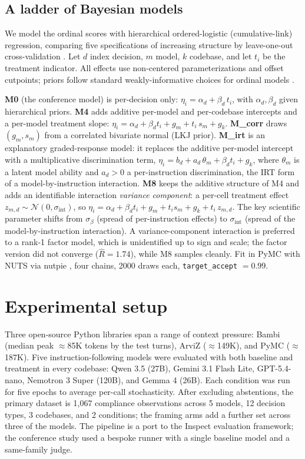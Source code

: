 \documentclass{llncs}
\begin{document}
\subsection{A ladder of Bayesian models}
\label{sec:models}
We model the ordinal scores with hierarchical ordered-logistic
(cumulative-link) regression, comparing five specifications of increasing
structure by leave-one-out cross-validation \parencite{vehtari2017loo}. Let
$d$ index decision, $m$ model, $k$ codebase, and let $t_i$ be the treatment
indicator. All effects use non-centered parameterizations and offset
cutpoints; priors follow standard weakly-informative choices for ordinal
models \parencite{mcelreath2020rethinking, burkner2021irt}.

\textbf{M0} (the conference model) is per-decision only:
$\eta_i = \alpha_{d} + \beta_{d}\, t_i$, with $\alpha_d, \beta_d$ given
hierarchical priors. \textbf{M4} adds additive per-model and per-codebase
intercepts and a per-model treatment slope:
$\eta_i = \alpha_d + \beta_d t_i + g_m + t_i\, s_m + g_k$. \textbf{M\_corr}
draws $(g_m, s_m)$ from a correlated bivariate normal (LKJ prior).
\textbf{M\_irt} is an explanatory graded-response model: it replaces the
additive per-model intercept with a multiplicative discrimination term,
$\eta_i = b_d + a_d\,\theta_m + \beta_d t_i + g_k$, where $\theta_m$ is a
latent model ability and $a_d>0$ a per-instruction discrimination, the IRT
form of a model-by-instruction interaction. \textbf{M8} keeps the additive
structure of M4 and adds an identifiable interaction \emph{variance
component}: a per-cell treatment effect
$z_{m,d}\sim\mathcal{N}(0, \sigma_{\text{int}})$, so
$\eta_i = \alpha_d + \beta_d t_i + g_m + t_i s_m + g_k + t_i\, z_{m,d}$. The
key scientific parameter shifts from $\sigma_\beta$ (spread of
per-instruction effects) to $\sigma_{\text{int}}$ (spread of the
model-by-instruction interaction). A variance-component interaction is
preferred to a rank-1 factor model, which is unidentified up to sign and
scale; the factor version did not converge ($\hat R = 1.74$), while M8
samples cleanly. Fit in PyMC \parencite{pymc2023} with NUTS via nutpie
\parencite{nutpie2024, hoffman2014}, four chains, 2000 draws each,
\texttt{target\_accept} $= 0.99$.

\section{Experimental setup}
\label{sec:setup}
Three open-source Python libraries span a range of context pressure: Bambi
(median peak $\approx$85K tokens by the test turns), ArviZ ($\approx$149K),
and PyMC ($\approx$187K). Five instruction-following models were evaluated
with both baseline and treatment in every codebase: Qwen 3.5 (27B),
Gemini 3.1 Flash Lite, GPT-5.4-nano, Nemotron 3 Super (120B), and
Gemma 4 (26B). Each condition was run for five epochs to average per-call
stochasticity. After excluding abstentions, the primary dataset is 1{,}067
compliance observations across 5 models, 12 decision types, 3 codebases, and
2 conditions; the framing arms add a further set across three of the models.
The pipeline is a port to the Inspect evaluation framework; the conference
study used a bespoke runner with a single baseline model and a same-family
judge.
\end{document}
